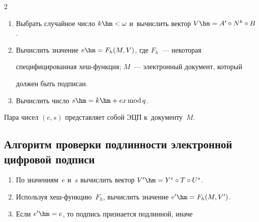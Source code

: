 \begin{multicols}{2}
  


  \noindent


  \begin{enumerate}[1.]


  \item Выбрать случайное число $k\hm<\omega$ и~вычислить вектор $V\hm= 


A^\prime \circ N^k\circ B$.


  \item Вычислить значение $e\hm= F_h(M,V)$, где $F_h$~--- некоторая 


специфицированная хеш-функ\-ция; $M$~--- электронный документ, который 


должен быть подписан.


  \item Вычислить число $s\hm= k\hm+ex\,\mathrm{mod}\,q$.


  \end{enumerate}


  


  Пара чисел $(e,s)$ представляет собой ЭЦП к~документу~$M$.


  


  \vspace*{-6pt}


  


  \subsection*{Алгоритм проверки подлинности электронной цифровой подписи}


  


  \noindent


  \begin{enumerate}[1.]


  


  \item По значениям~$e$ и~$s$ вычислить вектор $V^\prime\hm= Y^e\circ 


T\circ U^s$. 


  \item Используя хеш-функ\-цию~$F_h$, вычислить значение $e^\prime\hm= 


F_h(M,V^\prime)$.


  \item Если $e^\prime\hm=e$, то подпись признается подлинной, иначе 



\end{enumerate}
\end{multicols}
